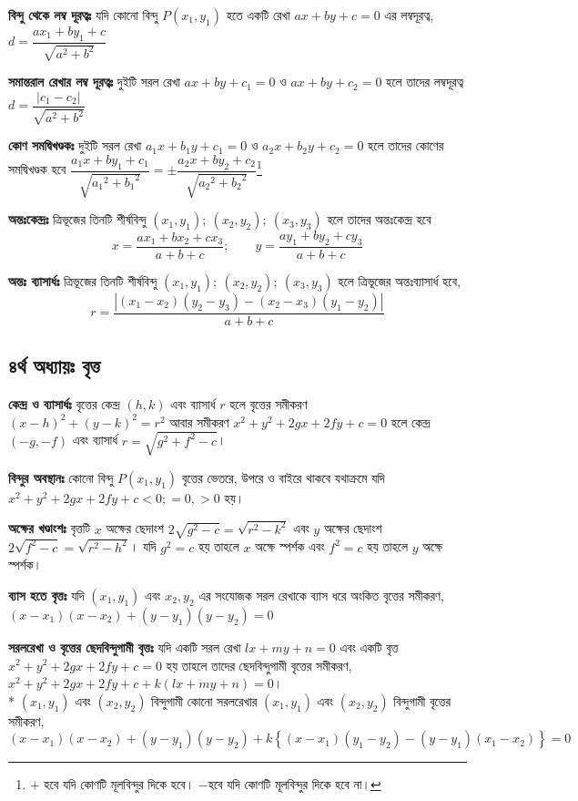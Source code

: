 \documentclass[a4paper,12pt]{article}
\newcommand{\lt}{\left}
\newcommand{\rt}{\right}
\begin{document}
\textbf{বিন্দু থেকে লম্ব দূরত্বঃ} যদি কোনো বিন্দু $P(x_1,y_1)$ হতে একটি রেখা $ax+by+c=0$ এর লম্বদূরত্ব, $d=\dfrac{ax_1+by_1+c}{\sqrt{a^2+b^2}}$  

\textbf{সমান্তরাল রেখার লম্ব দূরত্বঃ} দুইটি সরল রেখা $ax+by+c_1=0$ ও $ax+by+c_2=0$ হলে তাদের লম্বদূরত্ব $d=\dfrac{|c_1-c_2|}{\sqrt{a^2+b^2}}$ 

\textbf{কোণ সমদ্বিখণ্ডকঃ} দুইটি সরল রেখা $a_1x+b_1y+c_1=0$ ও $a_2x+b_2y+c_2=0$ হলে তাদের কোণের সমদ্বিখণ্ডক হবে $\dfrac{a_1x+by_1+c_1}{\sqrt{{a_1}^2+{b_1}^2}}=\pm \dfrac{a_2x+by_2+c_2}{\sqrt{{a_2}^2+{b_2}^2}}$\footnote{$+$ হবে যদি কোণটি মূলবিন্দুর দিকে হবে। $-$হবে যদি কোণটি মূলবিন্দুর দিকে হবে না।} 

\textbf{অন্তঃকেন্দ্রঃ} ত্রিভূজের তিনটি শীর্ষবিন্দু $(x_1,y_1); \ (x_2,y_2); \ (x_3,y_3)$ হলে তাদের অন্তঃকেন্দ্র হবে \[x=\dfrac{ax_1+bx_2+cx_3}{a+b+c}; \qquad
y=\dfrac{ay_1+by_2+cy_3}{a+b+c}\]

\textbf{অন্তঃ ব্যাসার্ধঃ} ত্রিভূজের তিনটি শীর্ষবিন্দু $(x_1,y_1); \ (x_2,y_2); \ (x_3,y_3)$ হলে ত্রিভূজের অন্তঃব্যাসার্ধ হবে, 
\[r=\dfrac{|(x_1-x_2)(y_2-y_3)-(x_2-x_3)(y_1-y_2)|}{a+b+c}\]

\subsection{৪র্থ অধ্যায়ঃ বৃত্ত} 

\textbf{কেন্দ্র ও ব্যাসার্ধঃ} বৃত্তের কেন্দ্র $(h,k)$ এবং ব্যাসার্ধ $r$ হলে বৃত্তের সমীকরণ $(x-h)^2+(y-k)^2=r^2$ আবার সমীকরণ $x^2+y^2+2gx+2fy+c=0$ হলে কেন্দ্র $(-g,-f)$ এবং ব্যাসার্ধ $r=\sqrt{g^2+f^2-c}$। 

\textbf{বিন্দুর অবস্থানঃ} কোনো বিন্দু $P(x_1,y_1)$ বৃত্তের ভেতরে, উপরে ও বাইরে থাকবে যথাক্রমে যদি $x^2+y^2+2gx+2fy+c<0; =0, >0$ হয়। 

\textbf{অক্ষের খণ্ডাংশঃ} বৃত্তটি $x$ অক্ষের ছেদাংশ $2\sqrt{g^2-c}=\sqrt{r^2-k^2}$ এবং $y$ অক্ষের ছেদাংশ $2\sqrt{f^2-c}=\sqrt{r^2-h^2}$। যদি $g^2=c$ হয় তাহলে $x$ অক্ষে স্পর্শক এবং $f^2=c$ হয় তাহলে $y$ অক্ষে স্পর্শক। 

\textbf{ব্যাস হতে বৃত্তঃ} যদি $(x_1,y_1)$ এবং $x_2,y_2$ এর সংযোজক সরল রেখাকে ব্যাস ধরে অংকিত বৃত্তের সমীকরণ, $(x-x_1)(x-x_2)+(y-y_1)(y-y_2)=0$

\textbf{সরলরেখা ও বৃত্তের ছেদবিন্দুগামী বৃত্তঃ} যদি একটি সরল রেখা $lx+my+n=0$ এবং একটি বৃত্ত $x^2+y^2+2gx+2fy+c=0$ হয় তাহলে তাদের ছেদবিন্দুগামী বৃত্তের সমীকরণ, $x^2+y^2+2gx+2fy+c+k(lx+my+n)=0$।\\* $(x_1,y_1)$ এবং $(x_2,y_2)$ বিন্দুগামী কোনো সরলরেখার $(x_1,y_1)$ এবং $(x_2,y_2)$ বিন্দুগামী বৃত্তের সমীকরণ, $(x-x_1)(x-x_2)+(y-y_1)(y-y_2)+k\lt\{ (x-x_1)(y_1-y_2)-(y-y_1)(x_1-x_2) \rt\}=0$
\end{document}
